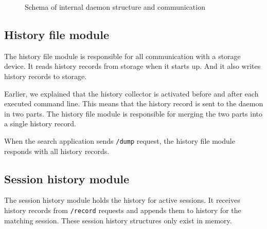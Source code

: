 
\begin{figure}
\centering
{}
\caption{Schema of internal daemon structure and communication}
\label{impl-daemon-channels}
\end{figure}

\subsection{History file module}

The history file module is responsible for all communication with a storage device. It reads history records from storage when it starts up. And it also writes history records to storage.

Earlier, we explained that the history collector is activated before and after each executed command line. This means that the history record is sent to the daemon in two parts. The history file module is responsible for merging the two parts into a single history record. 

When the search application sends \verb|/dump| request, the history file module responds with all history records. 


\subsection{Session history module}

The session history module holds the history for active sessions. It receives history records from \verb|/record| requests and appends them to history for the matching session.
These session history structures only exist in memory.

